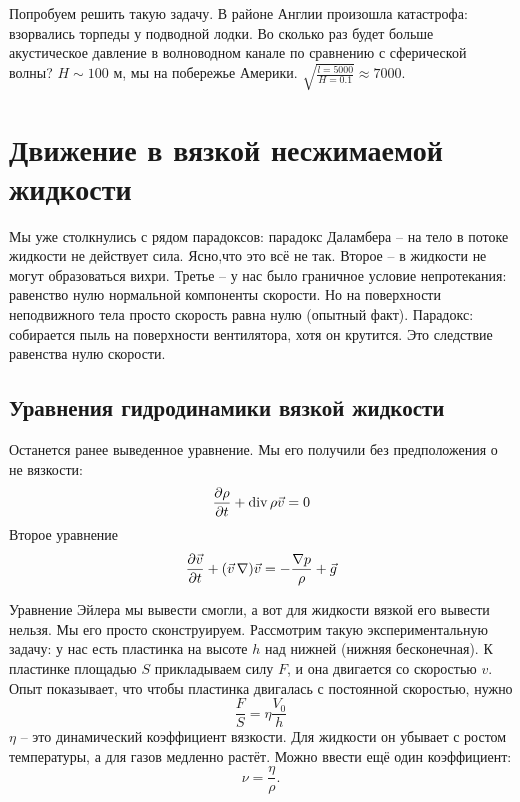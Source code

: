 Попробуем решить такую задачу. В районе Англии произошла катастрофа: взорвались торпеды у подводной лодки. Во сколько раз будет больше акустическое давление в волноводном канале по сравнению с сферической волны? $H \sim 100$ м, мы на побережье Америки. $\sqrt{\frac{l = 5000}{H = 0.1}} \approx 7000$.

\section{Движение в вязкой несжимаемой жидкости}

Мы уже столкнулись с рядом парадоксов: парадокс Даламбера -- на тело в потоке жидкости не действует сила. 
Ясно,что это всё не так. Второе -- в жидкости не могут образоваться вихри. Третье -- у нас было граничное условие непротекания:
равенство нулю нормальной компоненты скорости. Но на поверхности неподвижного тела просто скорость равна нулю (опытный факт). 
Парадокс: собирается пыль на поверхности вентилятора, хотя он крутится. Это следствие равенства нулю скорости. 

\subsection{Уравнения гидродинамики вязкой жидкости} %
Останется ранее выведенное уравнение. Мы его получили без предположения о не вязкости:
\begin{equation}
    \pdv{\rho}{t}+\operatorname{div} \rho \vec{v} = 0
\end{equation}
Второе уравнение 
\begin{equation}
    \pdv{\vec{v}}{t}+(\vec{v}\,\nabla)\vec{v} = -\frac{\nabla p}{\rho}+\vec{g}
\end{equation}

Уравнение Эйлера мы вывести смогли, а вот для жидкости вязкой его вывести нельзя. Мы его просто сконструируем.
Рассмотрим такую экспериментальную задачу: у нас есть пластинка на высоте $h$ над нижней (нижняя бесконечная). 
К пластинке площадью $S$ прикладываем силу $F$, и она двигается со скоростью $v$.
Опыт показывает, что чтобы пластинка двигалась с постоянной скоростью, нужно
\begin{equation}
    \frac{F}{S} = \eta \frac{V_0}{h}
\end{equation}
$\eta$ -- это динамический коэффициент вязкости. Для жидкости он убывает с ростом температуры, а для газов медленно растёт.
Можно ввести ещё один коэффициент:
\begin{equation}
    \nu = \frac{\eta}{\rho}.
\end{equation}


